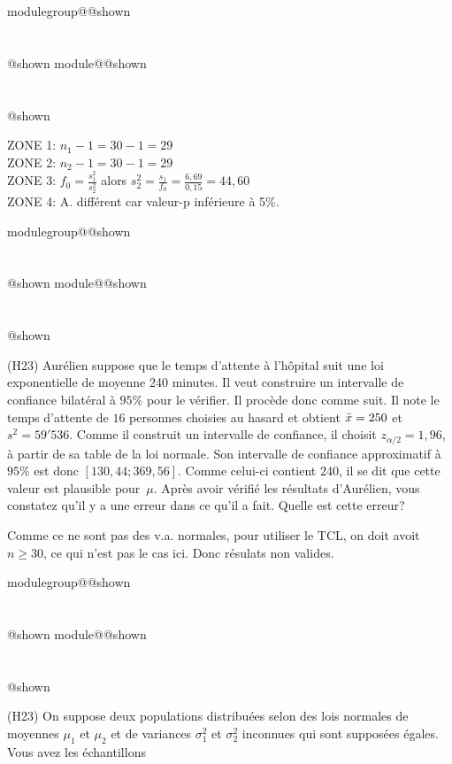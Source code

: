 \documentclass{Evaluation}
\makeatletter
\newcommand{\currentmodulekey}{}
\newcommand{\currentmoduletitle}{}
\newcommand{\currentgroupkey}{}
\newcommand{\currentgrouptitle}{}
\newcommand{\showmoduleifneeded}{%
  \ifx\currentgroupkey\empty\else
    \expandafter\ifx\csname modulegroup@\currentgroupkey @shown\endcsname\relax
      \section*{\currentgrouptitle}%
      \expandafter\gdef\csname modulegroup@\currentgroupkey @shown\endcsname{1}%
    \fi
  \fi
  \expandafter\ifx\csname module@\currentmodulekey @shown\endcsname\relax
    \section*{\currentmoduletitle}%
    \expandafter\gdef\csname module@\currentmodulekey @shown\endcsname{1}%
  \fi
}
\newenvironment{A22}{\showmoduleifneeded}{}
\newenvironment{H23}{\showmoduleifneeded}{}
\makeatother
\begin{document}
\begin{questions}
\begin{A22}
\begin{parts}

\end{parts}

	\begin{solution}
		ZONE 1:  $n_1-1=30-1=29$\\
		ZONE 2:  $n_2-1=30-1=29$\\
		ZONE 3: $\displaystyle f_0= \frac{s_1^2}{s_2^2}$ alors
		$ \displaystyle s_2^2 = \frac{s_1}{f_0}
		= \frac{6,69}{0,15}
		= 44,60	$ \\
		ZONE 4: A. différent car valeur-p inférieure à 5\%.\\
	\end{solution}

\end{A22}

\begin{H23}
\question
(H23)  Aurélien suppose que le temps d'attente à l'hôpital suit une loi exponentielle de moyenne 240 minutes. 
Il veut construire un intervalle de confiance bilatéral à $95\%$ pour le vérifier.
Il procède donc comme suit. 
Il note le temps d'attente de $16$ personnes choisies au hasard et obtient $\Bar{x}=250$ et $s^2=59'536$.
Comme il construit un intervalle de confiance, il choisit $z_{\alpha/2}=1,96$, à partir de sa table de la loi normale.
Son intervalle de confiance approximatif à $95\%$ est donc $[130,44;369,56]$.
Comme celui-ci contient $240$, il se dit que cette valeur est plausible pour~$\mu$. 
Après avoir vérifié les résultats d'Aurélien, vous constatez qu'il y a une erreur dans ce qu'il a fait. 
Quelle est cette erreur?
\begin{solution}
    Comme ce ne sont pas des v.a. normales, pour utiliser le TCL, on doit avoit $n\geq30$, ce qui n'est pas le cas ici. Donc résulats non valides.
\end{solution}

\end{H23}

\begin{H23}
\question
(H23)
On suppose deux populations distribuées selon des lois normales de moyennes $\mu_1$ et $\mu_2$ et de variances $\sigma^2_1$ et $\sigma^2_2$ inconnues qui sont supposées égales. Vous avez les échantillons


\end{H23}
\end{questions}
\end{document}
